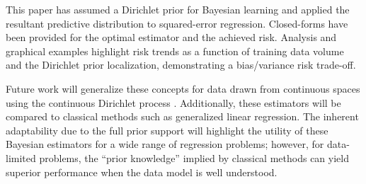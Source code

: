 \documentclass{article}
\begin{document}
This paper has assumed a Dirichlet prior for Bayesian learning and applied the resultant predictive distribution to squared-error regression. Closed-forms have been provided for the optimal estimator and the achieved risk. Analysis and graphical examples highlight risk trends as a function of training data volume and the Dirichlet prior localization, demonstrating a bias/variance risk trade-off.

Future work will generalize these concepts for data drawn from continuous spaces using the continuous Dirichlet process \cite{gershman}. Additionally, these estimators will be compared to classical methods such as generalized linear regression. The inherent adaptability due to the full prior support will highlight the utility of these Bayesian estimators for a wide range of regression problems; however, for data-limited problems, the ``prior knowledge'' implied by classical methods can yield superior performance when the data model is well understood.







\end{document}
